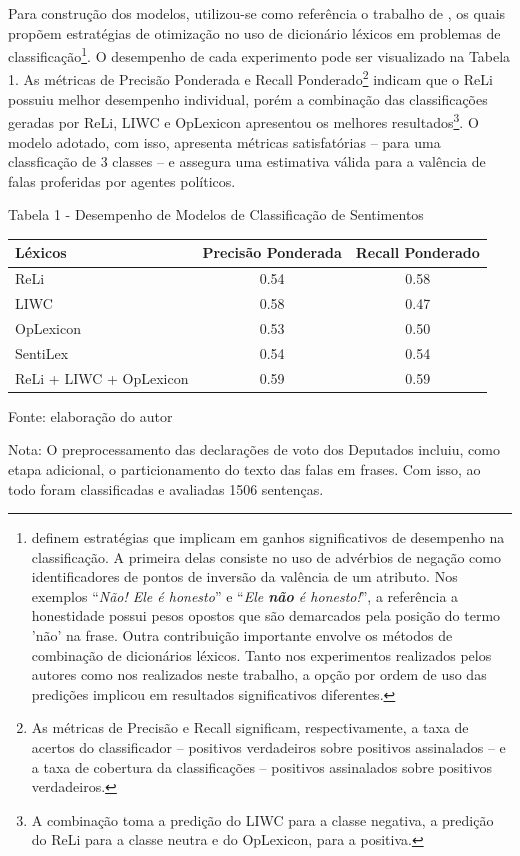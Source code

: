 \documentclass[
12pt,				%
openright,			%
twoside,			%
a4paper,			%
english,			%
french,				%
spanish,			%
brazil				%
]{abntex2}
\begin{document}
Para construção dos modelos, utilizou-se como referência o trabalho de , os quais propõem estratégias de otimização no uso de dicionário léxicos em problemas de classificação\footnote{ definem estratégias que implicam em ganhos significativos de desempenho na classificação. A primeira delas consiste no uso de advérbios de negação como identificadores de pontos de inversão da valência de um atributo. Nos exemplos ``\textit{Não! Ele é honesto}'' e ``\textit{Ele \textbf{não} é honesto!}'', a referência a honestidade possui pesos opostos que são demarcados pela posição do termo 'não' na frase. Outra contribuição importante envolve os métodos de combinação de dicionários léxicos. Tanto nos experimentos realizados pelos autores como nos realizados neste trabalho, a opção por ordem de uso das predições implicou em resultados significativos diferentes.}. O desempenho de cada experimento pode ser visualizado na Tabela 1. As métricas de Precisão Ponderada e Recall Ponderado\footnote{As métricas de Precisão e Recall significam, respectivamente, a taxa de acertos do classificador -- positivos verdadeiros sobre positivos assinalados -- e a taxa de cobertura da classificações -- positivos assinalados sobre positivos verdadeiros.} indicam que o ReLi possuiu melhor desempenho individual, porém a combinação das classificações geradas por ReLi, LIWC e OpLexicon apresentou os melhores resultados\footnote{A combinação toma a predição do LIWC para a classe negativa, a predição do ReLi para a classe neutra e do OpLexicon, para a positiva.}. O modelo adotado, com isso, apresenta métricas satisfatórias -- para uma classficação de 3 classes -- e assegura uma estimativa válida para a valência de falas proferidas por agentes políticos.   

\newpage
\begin{center}
	Tabela 1 - Desempenho de Modelos de Classificação de Sentimentos
	
	\vspace{0.4cm}
	
	\begin{tabular}{lcc}
		\toprule
		{Léxicos}					& {Precisão Ponderada} 	& {Recall Ponderado} \\ \midrule
		{ReLi} 						& 0.54					& 0.58 \\ 
		{LIWC} 						& 0.58					& 0.47 \\ 
		{OpLexicon} 				& 0.53					& 0.50 \\ 
		{SentiLex} 					& 0.54					& 0.54 \\ 
		{ReLi + LIWC + OpLexicon} 	& 0.59					& 0.59 \\ 
		\bottomrule
	\end{tabular}
	
	\vspace{0.6cm}
	
	Fonte: elaboração do autor
	\begin{flushleft}
		Nota: O preprocessamento das declarações de voto dos Deputados incluiu, como etapa adicional, o particionamento do texto das falas em frases. Com isso, ao todo foram classificadas e avaliadas 1506 sentenças.
	\end{flushleft}
\end{center}     
\end{document}
